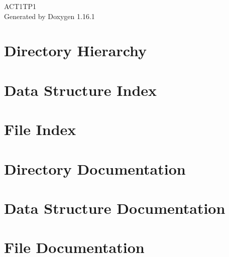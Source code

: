\documentclass[twoside]{book}
\newcommand{\+}{\discretionary{\mbox{\scriptsize$\hookleftarrow$}}{}{}}
\newcommand{\clearemptydoublepage}{%
    \newpage{\pagestyle{empty}\cleardoublepage}%
  }
\begin{document}
  \raggedbottom
    \hypersetup{pageanchor=false,
                bookmarksnumbered=true,
                pdfencoding=unicode
               }
  \begin{titlepage}
  \vspace*{7cm}
  \begin{center}%
  {\Large ACT1\+TP1}\\
  \vspace*{1cm}
  {\large Generated by Doxygen 1.16.1}\\
  \end{center}
  \end{titlepage}
  \clearemptydoublepage
  \tableofcontents
  \clearemptydoublepage
  \hypersetup{pageanchor=true}
\chapter{Directory Hierarchy}

\chapter{Data Structure Index}

\chapter{File Index}

\chapter{Directory Documentation}


\chapter{Data Structure Documentation}

\chapter{File Documentation}




  \backmatter
  \newpage
  \clearemptydoublepage
  \printindex
\end{document}
